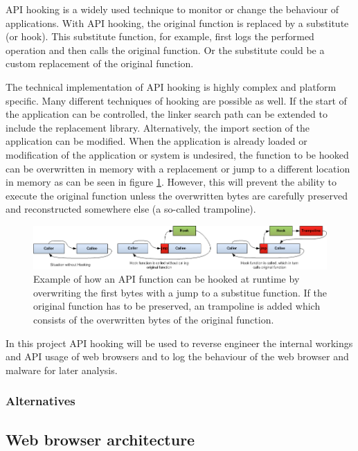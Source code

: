 API hooking is a widely used technique to monitor or change the behaviour of applications. With API hooking, the original function is replaced by a substitute (or hook). This substitute function, for example, first logs the performed operation and then calls the original function. Or the substitute could be a custom replacement of the original function.

The technical implementation of API hooking is highly complex and platform specific. Many different techniques\cite{jbremer2012} of hooking are possible as well. If the start of the application can be controlled, the linker search path can be extended to include the replacement library. Alternatively, the import section of the application can be modified. When the application is already loaded or modification of the application or system is undesired, the function to be hooked can be overwritten in memory with a replacement or jump to a different location in memory as can be seen in figure \ref{fig:apihooking}. However, this will prevent the ability to execute the original function unless the overwritten bytes are carefully preserved and reconstructed somewhere else (a so-called trampoline).

\begin{figure}
    \centering
    \includegraphics[width=14.7cm]{Images/API-hooking.png}
    \caption{Example of how an API function can be hooked at runtime by overwriting the first bytes with a jump to a substitue function. If the original function has to be preserved, an trampoline is added which consists of the overwritten bytes of the original function. \cite{APIHookImage}}
    \label{fig:apihooking}
\end{figure}

In this project API hooking will be used to reverse engineer the internal workings and API usage of web browsers and to log the behaviour of the web browser and malware for later analysis.

\subsubsection{Alternatives}



\subsection{Web browser architecture}

